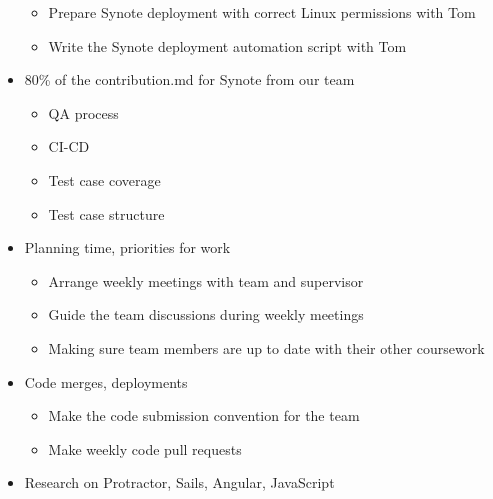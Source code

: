 \begin{itemize}
\begin{itemize}
  \item Prepare Synote deployment with correct Linux permissions with Tom
  \item Write the Synote deployment automation script with Tom
 \end{itemize}
 \item 80\% of the contribution.md for Synote from our team
 \begin{itemize}
  \item QA process
  \item CI-CD
  \item Test case coverage
  \item Test case structure
 \end{itemize}
 \item Planning time, priorities for work
 \begin{itemize}
  \item Arrange weekly meetings with team and supervisor
  \item Guide the team discussions during weekly meetings
  \item Making sure team members are up to date with their other coursework
 \end{itemize}
 \item Code merges, deployments
 \begin{itemize}
  \item Make the code submission convention for the team
  \item Make weekly code pull requests
 \end{itemize}
 \item Research on Protractor, Sails, Angular, JavaScript
\end{itemize}
